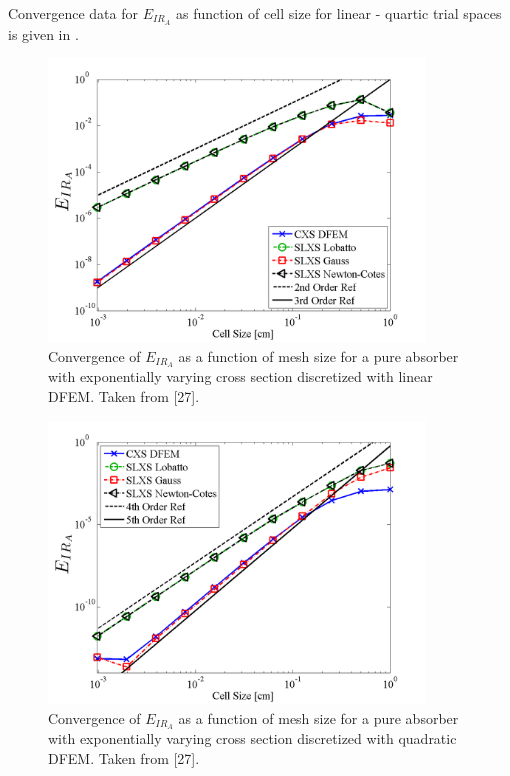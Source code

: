 Convergence data for $E_{IR_A}$ as function of cell size for linear - quartic trial spaces is given in .
%
\begin{figure}[!htp]
\centering
\includegraphics[width=10cm]{chapter3_variable_xs/P1_VarXS_E_I_A.png}
\caption{Convergence of $E_{IR_A}$  as a function of mesh size for a pure absorber with exponentially varying cross section discretized with linear DFEM.  Taken from [27].}
\label{fig:varxs_I_A_p1}
\end{figure}
%
%
\begin{figure}[!hbp]
\centering
\includegraphics[width=10cm]{chapter3_variable_xs/P2_VarXS_E_I_A.png}
\caption{Convergence of $E_{IR_A}$  as a function of mesh size for a pure absorber with exponentially varying cross section discretized with quadratic DFEM.  Taken from [27].}
\label{fig:varxs_I_A_p2}
\end{figure}
%
